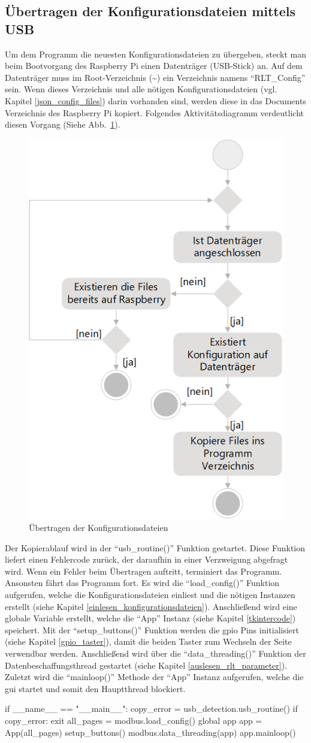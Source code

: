 \subsection{Übertragen der Konfigurationsdateien mittels USB}
Um dem Programm die neuesten Konfigurationsdateien zu übergeben, steckt man beim Bootvorgang des Raspberry Pi einen Datenträger (\zB USB-Stick) an. Auf dem Datenträger muss im Root-Verzeichnis (\textasciitilde) ein Verzeichnis namens \enquote{RLT\_Config} sein. Wenn dieses Verzeichnis und alle nötigen Konfigurationsdateien (vgl. Kapitel \ref{json_config_files}) darin vorhanden sind, werden diese in das Documents Verzeichnis des Raspberry Pi kopiert. Folgendes Aktivitätsdiagramm verdeutlicht diesen Vorgang (Siehe Abb.~\ref{fig:config_ubertragen_activity}).
\begin{figure}[H]
	\centering
	\includegraphics[width=0.4\linewidth]{Bilder/config_ubertragen_activity_diagram}
	\caption{Übertragen der Konfigurationsdateien}
	\label{fig:config_ubertragen_activity}
\end{figure}

Der Kopierablauf wird in der \enquote{usb\_routine()} Funktion gestartet. Diese Funktion liefert einen Fehlercode zurück, der daraufhin in einer Verzweigung abgefragt wird. Wenn ein Fehler beim Übertragen auftritt, terminiert das Programm. Ansonsten fährt das Programm fort. Es wird die \enquote{load\_config()} Funktion aufgerufen, welche die Konfigurationsdateien einliest und die nötigen Instanzen erstellt (siehe Kapitel \ref{einlesen_konfigurationsdateien}). Anschließend wird eine globale Variable erstellt, welche die \enquote{App} Instanz (siehe Kapitel \ref{tkintercode}) speichert. Mit der \enquote{setup\_buttons()} Funktion werden die \acs{gpio} Pins initialisiert (siehe Kapitel \ref{gpio_taster}), damit die beiden Taster zum Wechseln der Seite verwendbar werden. Anschließend wird über die \enquote{data\_threading()} Funktion der Datenbeschaffungsthread gestartet (siehe Kapitel  \ref{auslesen_rlt_parameter}). Zuletzt wird die \enquote{mainloop()} Methode der \enquote{App} Instanz aufgerufen, welche die \acs{gui} startet und somit den Hauptthread blockiert.
\begin{pythoncode}
if __name__ == "__main__":
	copy_error = usb_detection.usb_routine()
	if copy_error:
		exit
	all_pages = modbus.load_config()
	global app
	app = App(all_pages)
	setup_buttons()
	modbus.data_threading(app)
	app.mainloop()	
\end{pythoncode}

